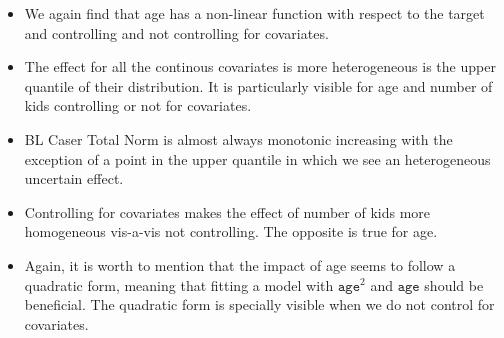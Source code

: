 \documentclass{article}
\begin{document}
\begin{itemize}
  \item We again find that age has a non-linear function with respect to the target and controlling and not controlling for covariates.
  \item The effect for all the continous covariates is more heterogeneous is the upper quantile of their distribution. It is particularly visible for age and number of kids controlling or not for covariates.
  \item BL Caser Total Norm is almost always monotonic increasing with the exception of a point in the upper quantile in which we see an heterogeneous uncertain effect.
  \item Controlling for covariates makes the effect of number of kids more homogeneous vis-a-vis not controlling. The opposite is true for age.
  \item Again, it is worth to mention that the impact of age seems to follow a quadratic form, meaning that fitting a model with $\texttt{age}^2$ and $\texttt{age}$ should be beneficial. The quadratic form is specially visible when we do not control for covariates.
\end{itemize}
\end{document}
